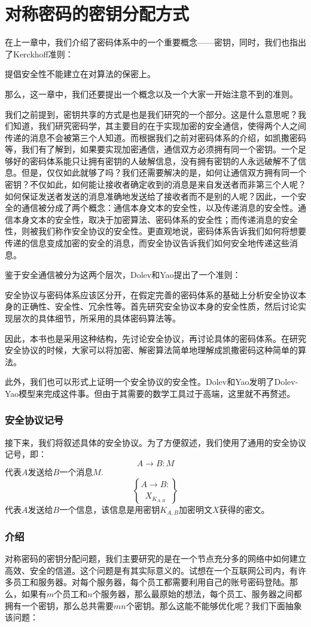 \section{对称密码的密钥分配方式}
在上一章中，我们介绍了密码体系中的一个重要概念——密钥，同时，我们也指出了Kerckhoff准则：\par
提倡安全性不能建立在对算法的保密上。\par
那么，这一章中，我们还要提出一个概念以及一个大家一开始注意不到的准则。\par
我们之前提到，密钥共享的方式是也是我们研究的一个部分。这是什么意思呢？我们知道，我们研究密码学，其主要目的在于实现加密的安全通信，使得两个人之间传递的消息不会被第三个人知道。而根据我们之前对密码体系的介绍，如凯撒密码等，我们有了解到，如果要实现加密通信，通信双方必须拥有同一个密钥。一个足够好的密码体系能只让拥有密钥的人破解信息，没有拥有密钥的人永远破解不了信息。但是，仅仅如此就够了吗？我们还需要解决的是，如何让通信双方拥有同一个密钥？不仅如此，如何能让接收者确定收到的消息是来自发送者而非第三个人呢？如何保证发送者发送的消息准确地发送给了接收者而不是别的人呢？因此，一个安全的通信被分成了两个概念：通信本身文本的安全性，以及传递消息的安全性。通信本身文本的安全性，取决于加密算法、密码体系的安全性；而传递消息的安全性，则被我们称作安全协议的安全性。更直观地说，密码体系告诉我们如何将想要传递的信息变成加密的安全的消息，而安全协议告诉我们如何安全地传递这些消息。\par
鉴于安全通信被分为这两个层次，Dolev和Yao提出了一个准则：\par
安全协议与密码体系应该区分开，在假定完善的密码体系的基础上分析安全协议本身的正确性、安全性、冗余性等。首先研究安全协议本身的安全性质，然后讨论实现层次的具体细节，所采用的具体密码算法等。\par
因此，本书也是采用这种结构，先讨论安全协议，再讨论具体的密码体系。在研究安全协议的时候，大家可以将加密、解密算法简单地理解成凯撒密码这种简单的算法。\par
此外，我们也可以形式上证明一个安全协议的安全性。Dolev和Yao发明了Dolev-Yao模型来完成这件事。但由于其需要的数学工具过于高端，这里就不再赘述。
\subsubsection{安全协议记号}
接下来，我们将叙述具体的安全协议。为了方便叙述，我们使用了通用的安全协议记号，即：
\[A\to B: M\]
代表$A$发送给$B$一个消息$M$.
\[A\to B: \brace{X}_{K_{A, B}}\]
代表$A$发送给$B$一个信息，该信息是用密钥$K_{A, B}$加密明文$X$获得的密文。
\subsubsection{介绍}
对称密码的密钥分配问题，我们主要研究的是在一个节点充分多的网络中如何建立高效、安全的信道。这个问题是有其实际意义的。试想在一个互联网公司内，有许多员工和服务器。对每个服务器，每个员工都需要利用自己的账号密码登陆。那么，如果有$m$个员工和$n$个服务器，那么最原始的想法，每个员工、服务器之间都拥有一个密钥，那么总共需要$mn$个密钥。那么这能不能够优化呢？我们下面抽象该问题：
